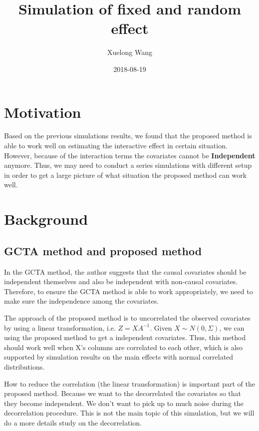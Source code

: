 \documentclass[]{article}
\title{Simulation of fixed and random effect}
\author{Xuelong Wang}
\date{2018-08-19}
\begin{document}
\maketitle

{
\setcounter{tocdepth}{2}
\tableofcontents
}
\section{Motivation}\label{motivation}

Based on the previous simulations results, we found that the proposed
method is able to work well on estimating the interactive effect in
certain situation. However, because of the interaction terms the
covariates cannot be \textbf{Independent} anymore. Thus, we may need to
conduct a series simulations with different setup in order to get a
large picture of what situation the proposed method can work well.

\section{Background}\label{background}

\subsection{GCTA method and proposed
method}\label{gcta-method-and-proposed-method}

In the GCTA method, the author suggests that the causal covariates
should be independent themselves and also be independent with non-causal
covariates. Therefore, to ensure the GCTA method is able to work
appropriately, we need to make sure the independence among the
covariates.

The approach of the proposed method is to uncorrelated the observed
covariates by using a linear transformation, i.e. \(Z = XA^{-1}\). Given
\(X \sim N(0, \Sigma)\), we can using the proposed method to get a
independent covariates. Thus, this method should work well when X's
columns are correlated to each other, which is also supported by
simulation results on the main effects with normal correlated
distributions.

How to reduce the correlation (the linear transformation) is important
part of the proposed method. Because we want to the decorrelated the
covariates so that they become independent. We don't want to pick up to
much noise during the decorrelation procedure. This is not the main
topic of this simulation, but we will do a more details study on the
decorrelation.
\end{document}
